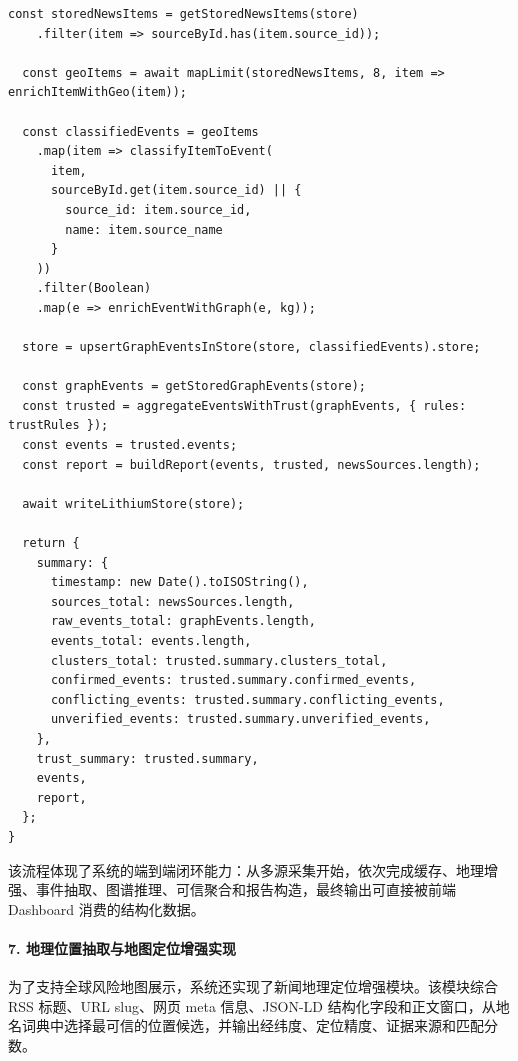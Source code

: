 ﻿\documentclass[12pt,a4paper]{article}
\begin{document}
\begin{lstlisting}[style=projectcode,caption={多源采集、增量入库、图谱增强与可信聚合流程}]
  const storedNewsItems = getStoredNewsItems(store)
    .filter(item => sourceById.has(item.source_id));

  const geoItems = await mapLimit(storedNewsItems, 8, item => enrichItemWithGeo(item));

  const classifiedEvents = geoItems
    .map(item => classifyItemToEvent(
      item,
      sourceById.get(item.source_id) || {
        source_id: item.source_id,
        name: item.source_name
      }
    ))
    .filter(Boolean)
    .map(e => enrichEventWithGraph(e, kg));

  store = upsertGraphEventsInStore(store, classifiedEvents).store;

  const graphEvents = getStoredGraphEvents(store);
  const trusted = aggregateEventsWithTrust(graphEvents, { rules: trustRules });
  const events = trusted.events;
  const report = buildReport(events, trusted, newsSources.length);

  await writeLithiumStore(store);

  return {
    summary: {
      timestamp: new Date().toISOString(),
      sources_total: newsSources.length,
      raw_events_total: graphEvents.length,
      events_total: events.length,
      clusters_total: trusted.summary.clusters_total,
      confirmed_events: trusted.summary.confirmed_events,
      conflicting_events: trusted.summary.conflicting_events,
      unverified_events: trusted.summary.unverified_events,
    },
    trust_summary: trusted.summary,
    events,
    report,
  };
}
\end{lstlisting}

该流程体现了系统的端到端闭环能力：从多源采集开始，依次完成缓存、地理增强、事件抽取、图谱推理、可信聚合和报告构造，最终输出可直接被前端 Dashboard 消费的结构化数据。

\paragraph{7. 地理位置抽取与地图定位增强实现}

为了支持全球风险地图展示，系统还实现了新闻地理定位增强模块。该模块综合 RSS 标题、URL slug、网页 meta 信息、JSON-LD 结构化字段和正文窗口，从地名词典中选择最可信的位置候选，并输出经纬度、定位精度、证据来源和匹配分数。
\end{document}
